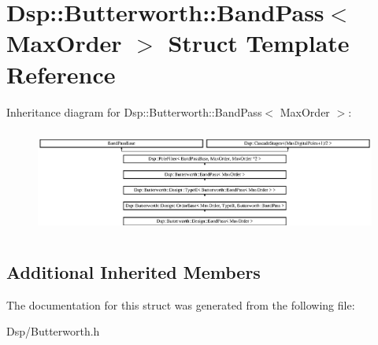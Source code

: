 \hypertarget{structDsp_1_1Butterworth_1_1BandPass}{\section{Dsp\-:\-:Butterworth\-:\-:Band\-Pass$<$ Max\-Order $>$ Struct Template Reference}
\label{structDsp_1_1Butterworth_1_1BandPass}
}
Inheritance diagram for Dsp\-:\-:Butterworth\-:\-:Band\-Pass$<$ Max\-Order $>$\-:\begin{figure}[H]
\begin{center}
\leavevmode
\includegraphics[height=3.463917cm]{structDsp_1_1Butterworth_1_1BandPass}
\end{center}
\end{figure}
\subsection*{Additional Inherited Members}


The documentation for this struct was generated from the following file\-:\begin{DoxyCompactItemize}
\item 
Dsp/Butterworth.\-h\end{DoxyCompactItemize}

